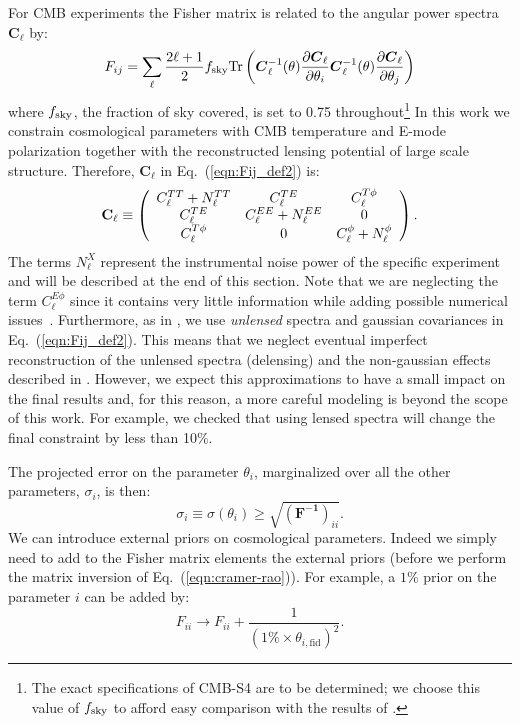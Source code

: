 \documentclass[aps,prd,reprint,superscriptaddress,nofootinbib,floatfix]{revtex4-1}
\newcommand\refeq[1]{Eq.~(\ref{eqn:#1})}
\begin{document}
For CMB experiments the Fisher matrix is related to the angular power spectra $\boldsymbol{C}_\ell$ by:
\begin{equation}
 F_{ij} = \sum_\ell \frac{2\ell+1}{2} f_{\rm sky} {\rm Tr} \left(  \boldsymbol{C}^{-1}_\ell( \theta) \frac{\partial \boldsymbol{C}_\ell}{\partial \theta_i} \boldsymbol{C}^{-1}_\ell( \theta) \frac{\partial \boldsymbol{C}_\ell}{\partial \theta_j}  \right)
 \label{eqn:Fij_def2}
 \end{equation}
 where $f_{\rm sky}$, the fraction of sky covered, is set to 0.75 throughout\footnote{The exact specifications of CMB-S4 are to be determined; we choose this value of $f_{\rm sky}$ to afford easy comparison with the results of \cite{wu:2014}.}
In this work we constrain cosmological parameters with CMB temperature and E-mode polarization together with the reconstructed lensing potential of large scale structure. Therefore, $\boldsymbol{C}_\ell$ in \refeq{Fij_def2} is:
 \begin{eqnarray}
 	\centering
		\mathbf{C}_\ell \equiv \left( \begin{array}{ccc}C_\ell^{TT} + N_\ell^{TT} & C_\ell^{TE} & C_\ell^{T\phi} \\ C_\ell^{TE} & C_\ell^{EE} + N_\ell^{EE} & 0 \\ C_\ell^{T\phi} & 0 & C_\ell^{\phi} + N_\ell^{\phi}\end{array}\right).
	\label{eqn:cov_definition}
\end{eqnarray}
The terms $N_\ell^{X}$ represent the instrumental noise power of the specific experiment and will be described at the end of this section.
Note that we are neglecting the term $C_\ell^{E\phi}$ since it contains very little information while adding possible numerical issues~\cite{wu:2014,2013PhRvD..87h3008H}.
Furthermore, as in \cite{wu:2014}, we use \textit{unlensed} spectra and gaussian covariances in \refeq{Fij_def2}. 
This means that we neglect eventual imperfect reconstruction of the unlensed spectra (delensing) and the non-gaussian effects described in \cite{benoit-levy:2012} .
However, we expect this approximations to have a small impact on the final results and, for this reason, a more careful modeling is beyond the scope of this work. For example, we checked that using lensed spectra will change the final constraint by less than 10$\%$.

The projected error on the parameter $\theta_i$, marginalized over all the other parameters, $\sigma_i$, is then:
\begin{equation}
\sigma_i \equiv \sigma (\theta_i) \geq \sqrt{(\mathbf{ F^{-1}})_{ii}}.
\label{eqn:cramer-rao}
\end{equation}
We can introduce external priors on cosmological parameters.
Indeed we simply need to add to the Fisher matrix elements the external priors (before we perform the matrix inversion of \refeq{cramer-rao}).
For example, a $1\%$ prior on the parameter $i$ can be added by:
\begin{equation}
F_{ii} \rightarrow F_{ii} + \frac{1}{(1\% \times  \theta_{i,\text{fid}})^2}.
\end{equation}
\end{document}
